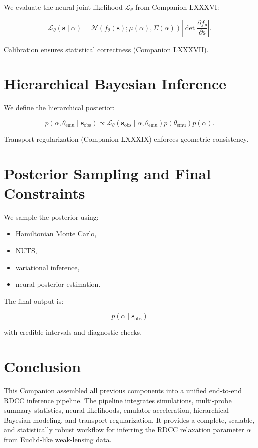\documentclass[11pt,a4paper]{article}
\begin{document}
We evaluate the neural joint likelihood $\mathcal{L}_{\theta}$ from Companion 
LXXXVI:



\[
    \mathcal{L}_{\theta}(\mathbf{s} \mid \alpha)
    =
    \mathcal{N}\!\left(
        f_{\theta}(\mathbf{s});
        \mu(\alpha),
        \Sigma(\alpha)
    \right)
    \left|
        \det \frac{\partial f_{\theta}}{\partial \mathbf{s}}
    \right|.
\]



Calibration ensures statistical correctness (Companion LXXXVII).
\section{Hierarchical Bayesian Inference}

We define the hierarchical posterior:



\[
    p(\alpha, \theta_{\mathrm{emu}} \mid \mathbf{s}_{\mathrm{obs}})
    \propto
    \mathcal{L}_{\theta}(\mathbf{s}_{\mathrm{obs}} \mid \alpha, \theta_{\mathrm{emu}})
    p(\theta_{\mathrm{emu}})
    p(\alpha).
\]



Transport regularization (Companion LXXXIX) enforces geometric consistency.
\section{Posterior Sampling and Final Constraints}

We sample the posterior using:

\begin{itemize}
    \item Hamiltonian Monte Carlo,
    \item NUTS,
    \item variational inference,
    \item neural posterior estimation.
\end{itemize}

The final output is:



\[
    p(\alpha \mid \mathbf{s}_{\mathrm{obs}})
\]



with credible intervals and diagnostic checks.
\section{Conclusion}

This Companion assembled all previous components into a unified end-to-end RDCC 
inference pipeline. The pipeline integrates simulations, multi-probe summary 
statistics, neural likelihoods, emulator acceleration, hierarchical Bayesian 
modeling, and transport regularization. It provides a complete, scalable, and 
statistically robust workflow for inferring the RDCC relaxation parameter $\alpha$ 
from Euclid-like weak-lensing data.


\nocite{*}

\end{document}

